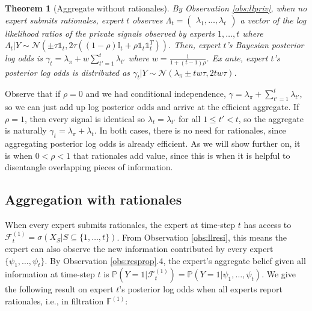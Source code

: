 \documentclass{winnower}
\newtheorem{theorem}{Theorem}
\begin{document}
\begin{theorem}[Aggregate without rationales]\label{lem:aggwout}
    By Observation \ref{obs:llpriv}, when no expert submits rationales, expert $t$ observes $\Lambda_{t} = \begin{pmatrix} {\lambda}_1, \ldots, {\lambda}_{t} \end{pmatrix}$ a vector of the log likelihood ratios of the private signals observed by experts $1, \ldots, t$ where $\Lambda_{t}|Y \sim \mathcal{N}\left(\pm \tau \mathds{1}_{t}, 2\tau((1-\rho)\mathbb{I}_t + \rho\mathds{1}_t\mathds{1}_t^T) \right)$. Then, expert $t$'s Bayesian posterior log odds is $\gamma_t =\lambda_\pi +  w\sum_{t'=1}^t \lambda_{t'}$ where $w = \frac{1}{1+(t-1)\rho}$. Ex ante, expert $t$'s posterior log odds is distributed as $\gamma_t|Y \sim \mathcal{N}\left(\lambda_\pi \pm tw\tau , 2tw\tau\right)$.
\end{theorem}


Observe that if $\rho=0$ and we had conditional independence, $\gamma = \lambda_\pi + \sum_{t'=1}^t \lambda_{t'}$, so we can just add up log posterior odds and arrive at the efficient aggregate. If $\rho =1$, then every signal is identical so $\lambda_t = \lambda_{t'}$ for all $1 \leq t' < t$, so the aggregate is naturally $\gamma_t = \lambda_\pi + \lambda_{t}$. In both cases, there is no need for rationales, since aggregating posterior log odds is already efficient. As we will show further on, it is when $0 < \rho < 1$ that rationales add value, since this is when it is helpful to disentangle overlapping pieces of information.

\subsection{Aggregation with rationales}

When every expert submits rationales, the expert at time-step $t$ has access to $\mathcal{F}_t^{(1)} = \sigma\left(X_S | S \subseteq \{1,\ldots, t\}\right)$. From Observation \ref{obs:llresi}, this means the expert can also observe the new information contributed by every expert $\{\psi_1, \ldots, \psi_{t}\}$. By Observation \ref{obs:resprop}.4, the expert's aggregate belief given all information at time-step $t$ is $\mathbb{P}(Y=1|\mathcal{F}_t^{(1)})  = \mathbb{P}(Y=1 | \psi_1, \ldots, \psi_t)$. We give the following result on expert $t$'s posterior log odds when all experts report rationales, i.e., in filtration $\mathbb{F}^{(1)}$:
\end{document}
